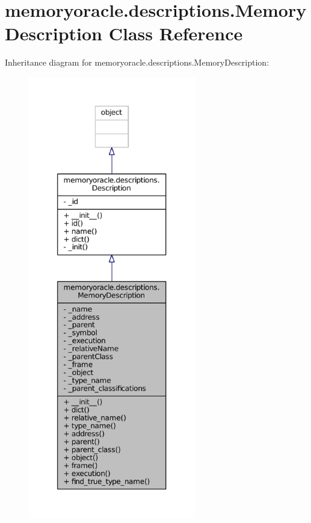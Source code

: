 \hypertarget{classmemoryoracle_1_1descriptions_1_1MemoryDescription}{}\section{memoryoracle.\+descriptions.\+Memory\+Description Class Reference}
\label{classmemoryoracle_1_1descriptions_1_1MemoryDescription}


Inheritance diagram for memoryoracle.\+descriptions.\+Memory\+Description\+:
\nopagebreak
\begin{figure}[H]
\begin{center}
\leavevmode
\includegraphics[height=550pt]{classmemoryoracle_1_1descriptions_1_1MemoryDescription__inherit__graph}
\end{center}
\end{figure}


